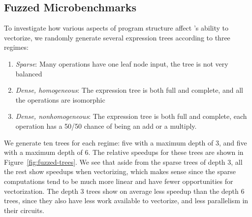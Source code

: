 \subsection{Fuzzed Microbenchmarks}
To investigate how various aspects of program structure affect \system's ability to vectorize, we randomly generate several expression trees according to three regimes:
\begin{enumerate}
    \item {\em Sparse}: Many operations have one leaf node input, the tree is not very balanced
    \item {\em Dense, homogeneous}: The expression tree is both full and complete, and all the operations are isomorphic
    \item {\em Dense, nonhomogeneous}: The expression tree is both full and complete, each operation has a 50/50 chance of being an add or a multiply.
\end{enumerate}
We generate ten trees for each regime: five with a maximum depth of 3, and five with a maximum depth of 6.
The relative speedups for these trees are shown in Figure~\ref{fig:fuzzed-trees}.
We see that aside from the sparse trees of depth 3, all the rest show speedups when vectorizing, which makes sense since the sparse computations tend to be much more linear and have fewer opportunities for vectorization.
The depth 3 trees show on average less speedup than the depth 6 trees, since they also have less work available to vectorize, and less parallelism in their circuits. %

